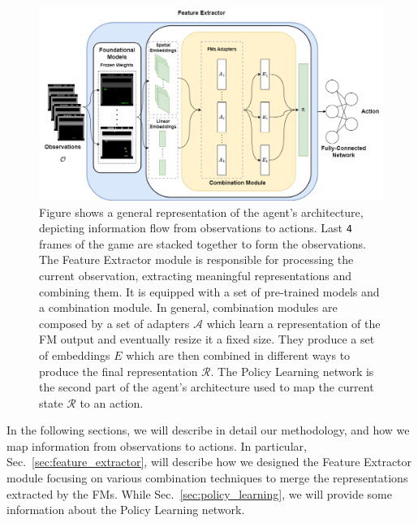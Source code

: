 \begin{figure}[ht]
    \begin{center}
        \includegraphics[width=1\textwidth]{images/main_architecture_new}
    \end{center}
    \caption{Figure shows a general representation of the agent's architecture, depicting information flow from observations to actions.
    Last \texttt{4} frames of the game are stacked together to form the observations.
    The Feature Extractor module is responsible for processing the current observation, extracting meaningful representations and combining them.
    It is equipped with a set of pre-trained models and a combination module.
    In general, combination modules are composed by a set of adapters $\mathcal{A}$ which learn a representation of the FM output and eventually resize it a fixed size.
    They produce a set of embeddings $E$ which are then combined in different ways to produce the final representation $\mathcal{R}$.
    The Policy Learning network is the second part of the agent's architecture used to map the current state $\mathcal{R}$ to an action.}
    \label{fig:main}
\end{figure}


In the following sections, we will describe in detail our methodology, and how we map information from observations to actions.
In particular, Sec.~\ref{sec:feature_extractor}, will describe how we designed the Feature Extractor module focusing on various combination techniques to merge the representations extracted by the FMs.
While Sec.~\ref{sec:policy_learning}, we will provide some information about the Policy Learning network.




